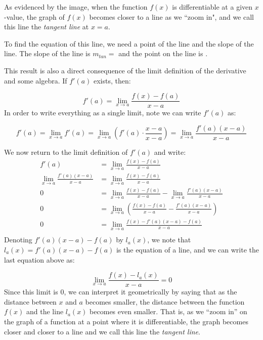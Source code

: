 \documentclass[nooutcomes]{ximera}
\begin{document}
As evidenced by the image, when the function $f(x)$ is differentiable at a given $x$-value, the graph of $f(x)$ becomes closer to a line as we ``zoom in", and we call this line the \emph{tangent line} at $x=a$.

To find the equation of this line, we need a point of the line and the slope of the line.  The slope of the line is $m_{tan} =$  and the point on the line is .


This result is also a direct consequence of the limit definition of the derivative and some algebra.  If $f'(a)$ exists, then:

\[
f'(a) = \lim_{x \to a} \frac{f(x)-f(a)}{x-a}
\]
In order to write everything as a single limit, note we can write $f'(a)$ as:

\[
f'(a) = \lim_{x \to a} f'(a) =  \lim_{x \to a} \left(f'(a) \cdot \frac{x-a}{x-a}\right) = \lim_{x \to a} \frac{f'(a)(x-a)}{x-a}
\]

We now return to the limit definition of $f'(a)$ and write: 
\begin{align*}
f'(a) &= \lim_{x \to a} \frac{f(x)-f(a)}{x-a}\\
\lim_{x \to a} \frac{f'(a)(x-a)}{x-a} &= \lim_{x \to a} \frac{f(x)-f(a)}{x-a}\\
0 &= \lim_{x \to a} \frac{f(x)-f(a)}{x-a} - \lim_{x \to a} \frac{f'(a)(x-a)}{x-a}\\
0 &= \lim_{x \to a} \left(\frac{f(x)-f(a)}{x-a} - \frac{f'(a)(x-a)}{x-a} \right)\\
0 &= \lim_{x \to a} \frac{f(x)-f'(a)(x-a) - f(a)}{x-a}\\
\end{align*} 
Denoting $ f'(a)(x-a) - f(a)$ by $l_a(x)$, we note that $l_a(x)= f'(a)(x-a) - f(a)$ is the equation of a line, and we can write the last equation above as:

\[
\lim_{x \to a} \frac{f(x)-l_a(x)}{x-a} = 0
\]
Since this limit is $0$, we can interpret it geometrically by saying that as the distance between $x$ and $a$ becomes smaller, the distance between the function $f(x)$ and the line $l_a(x)$ becomes even smaller.  That is, as we ``zoom in'' on the graph of a function at a point where it is differentiable, the graph becomes closer and closer to a line and we call this line the \emph{tangent line}.
\end{document}
